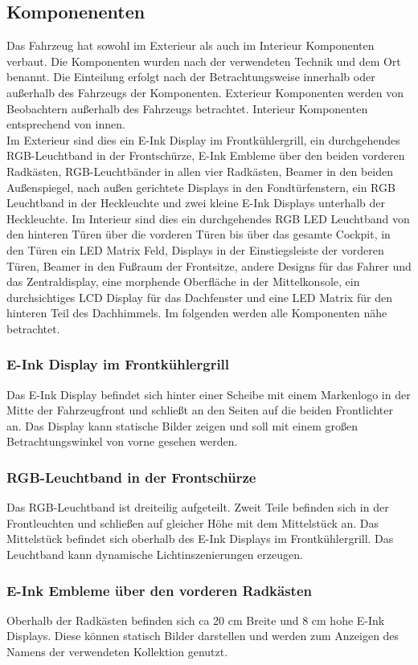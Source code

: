 \subsection{Komponenenten}
Das Fahrzeug hat sowohl im Exterieur als auch im Interieur Komponenten verbaut. Die Komponenten wurden nach der verwendeten Technik und dem Ort benannt. Die Einteilung erfolgt nach der Betrachtungsweise innerhalb oder außerhalb des Fahrzeugs der Komponenten. Exterieur Komponenten werden von Beobachtern außerhalb des Fahrzeugs betrachtet. Interieur Komponenten entsprechend von innen.\\
Im Exterieur sind dies ein E-Ink Display im Frontkühlergrill, ein durchgehendes RGB-Leuchtband in der Frontschürze, E-Ink Embleme über den beiden vorderen Radkästen, RGB-Leuchtbänder in allen vier Radkästen, Beamer in den beiden Außenspiegel, nach außen gerichtete Displays in den Fondtürfenstern, ein RGB Leuchtband in der Heckleuchte und zwei kleine E-Ink Displays unterhalb der Heckleuchte.
Im Interieur sind dies ein durchgehendes RGB LED Leuchtband von den hinteren Türen über die vorderen Türen bis über das gesamte Cockpit, in den Türen ein LED Matrix Feld, Displays in der Einstiegsleiste der vorderen Türen, Beamer in den Fußraum der Frontsitze, andere Designs für das Fahrer und das Zentraldisplay, eine morphende Oberfläche in der Mittelkonsole, ein durchsichtiges LCD Display für das Dachfenster und eine LED Matrix für den hinteren Teil des Dachhimmels.
Im folgenden werden alle Komponenten nähe betrachtet.
\subsubsection{E-Ink Display im Frontkühlergrill}
Das E-Ink Display befindet sich hinter einer Scheibe mit einem Markenlogo in der Mitte der Fahrzeugfront und schließt an den Seiten auf die beiden Frontlichter an. Das Display kann statische Bilder zeigen und soll mit einem großen Betrachtungswinkel von vorne gesehen werden.
\subsubsection{RGB-Leuchtband in der Frontschürze}
Das RGB-Leuchtband ist dreiteilig aufgeteilt. Zweit Teile befinden sich in der Frontleuchten und schließen auf gleicher Höhe mit dem Mittelstück an. Das Mittelstück befindet sich oberhalb des E-Ink Displays im Frontkühlergrill. Das Leuchtband kann dynamische Lichtinszenierungen erzeugen.
\subsubsection{E-Ink Embleme über den vorderen Radkästen}
Oberhalb der Radkästen befinden sich ca 20 cm Breite und 8 cm hohe E-Ink Displays. Diese können statisch Bilder darstellen und werden zum Anzeigen des Namens der verwendeten Kollektion genutzt.
